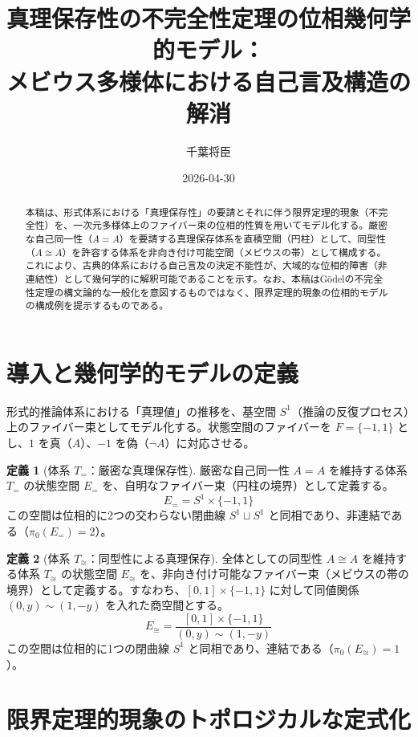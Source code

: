 \documentclass[11pt,a4paper]{article}
\title{真理保存性の不完全性定理の位相幾何学的モデル：\\メビウス多様体における自己言及構造の解消}
\author{千葉将臣}
\date{2026-04-30}
\theoremstyle{definition}
\newtheorem{definition}{定義}[section]
\begin{document}
\maketitle

\begin{abstract}
本稿は、形式体系における「真理保存性」の要請とそれに伴う限界定理的現象（不完全性）を、一次元多様体上のファイバー束の位相的性質を用いてモデル化する。厳密な自己同一性（$A=A$）を要請する真理保存体系を直積空間（円柱）として、同型性（$A \cong A$）を許容する体系を非向き付け可能空間（メビウスの帯）として構成する。これにより、古典的体系における自己言及の決定不能性が、大域的な位相的障害（非連結性）として幾何学的に解釈可能であることを示す。なお、本稿はGödelの不完全性定理の構文論的な一般化を意図するものではなく、限界定理的現象の位相的モデルの構成例を提示するものである。
\end{abstract}

\section{導入と幾何学的モデルの定義}

形式的推論体系における「真理値」の推移を、基空間 $S^1$（推論の反復プロセス）上のファイバー束としてモデル化する。状態空間のファイバーを $F = \{-1, 1\}$ とし、$1$ を真（$A$）、$-1$ を偽（$\neg A$）に対応させる。

\begin{definition}[体系 $T_{=}$：厳密な真理保存性]
厳密な自己同一性 $A=A$ を維持する体系 $T_{=}$ の状態空間 $E_{=}$ を、自明なファイバー束（円柱の境界）として定義する。
$$ E_{=} = S^1 \times \{-1, 1\} $$
この空間は位相的に2つの交わらない閉曲線 $S^1 \sqcup S^1$ と同相であり、非連結である（$\pi_0(E_{=}) = 2$）。
\end{definition}

\begin{definition}[体系 $T_{\cong}$：同型性による真理保存]
全体としての同型性 $A \cong A$ を維持する体系 $T_{\cong}$ の状態空間 $E_{\cong}$ を、非向き付け可能なファイバー束（メビウスの帯の境界）として定義する。すなわち、$[0, 1] \times \{-1, 1\}$ に対して同値関係 $(0, y) \sim (1, -y)$ を入れた商空間とする。
$$ E_{\cong} = \frac{[0, 1] \times \{-1, 1\}}{(0, y) \sim (1, -y)} $$
この空間は位相的に1つの閉曲線 $S^1$ と同相であり、連結である（$\pi_0(E_{\cong}) = 1$）。
\end{definition}

\section{限界定理的現象のトポロジカルな定式化}
\end{document}
